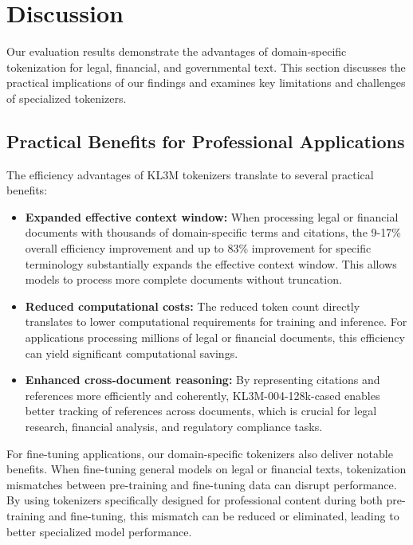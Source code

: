 \section{Discussion}

Our evaluation results demonstrate the advantages of domain-specific tokenization for legal, financial, and governmental text. This section discusses the practical implications of our findings and examines key limitations and challenges of specialized tokenizers.

\subsection{Practical Benefits for Professional Applications}

The efficiency advantages of KL3M tokenizers translate to several practical benefits:

\begin{itemize}
    \item \textbf{Expanded effective context window:} When processing legal or financial documents with thousands of domain-specific terms and citations, the 9-17\% overall efficiency improvement and up to 83\% improvement for specific terminology substantially expands the effective context window. This allows models to process more complete documents without truncation.
    
    \item \textbf{Reduced computational costs:} The reduced token count directly translates to lower computational requirements for training and inference. For applications processing millions of legal or financial documents, this efficiency can yield significant computational savings.
    
    \item \textbf{Enhanced cross-document reasoning:} By representing citations and references more efficiently and coherently, KL3M-004-128k-cased enables better tracking of references across documents, which is crucial for legal research, financial analysis, and regulatory compliance tasks.
\end{itemize}

For fine-tuning applications, our domain-specific tokenizers also deliver notable benefits. When fine-tuning general models on legal or financial texts, tokenization mismatches between pre-training and fine-tuning data can disrupt performance. By using tokenizers specifically designed for professional content during both pre-training and fine-tuning, this mismatch can be reduced or eliminated, leading to better specialized model performance.

